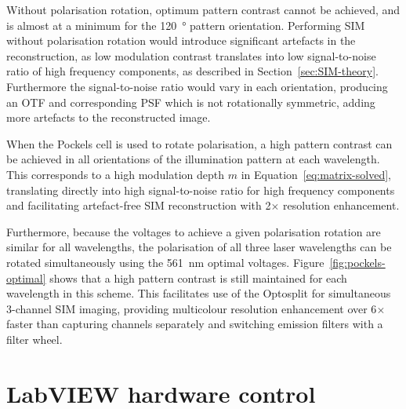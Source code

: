 Without polarisation rotation, optimum pattern contrast cannot be achieved, and is almost at a minimum for the \SI{120}{\degree} pattern orientation.
Performing SIM without polarisation rotation would introduce significant artefacts in the reconstruction, as low modulation contrast translates into low signal-to-noise ratio of high frequency components, as described in Section~\ref{sec:SIM-theory}.
Furthermore the signal-to-noise ratio would vary in each orientation, producing an OTF and corresponding PSF which is not rotationally symmetric, adding more artefacts to the reconstructed image.

When the Pockels cell is used to rotate polarisation, a high pattern contrast can be achieved in all orientations of the illumination pattern at each wavelength.
This corresponds to a high modulation depth $m$ in Equation~\ref{eq:matrix-solved}, translating directly into high signal-to-noise ratio for high frequency components and facilitating artefact-free SIM reconstruction with 2$\times$ resolution enhancement.

Furthermore, because the voltages to achieve a given polarisation rotation are similar for all wavelengths, the polarisation of all three laser wavelengths can be rotated simultaneously using the \SI{561}{\nano\metre} optimal voltages.
Figure~\ref{fig:pockels-optimal} shows that a high pattern contrast is still maintained for each wavelength in this scheme.
This facilitates use of the Optosplit for simultaneous 3-channel SIM imaging, providing multicolour resolution enhancement over 6$\times$ faster than capturing channels separately and switching emission filters with a filter wheel.


\section{LabVIEW hardware control} \label{sec:labview}
